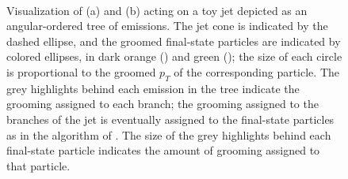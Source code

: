 \begin{figure}[t!]
      \centering
      \centerline{
      ~~~~
      } %
\caption{
    Visualization of (a)  and (b)  acting on a toy jet depicted as an angular-ordered tree of emissions.
    The jet cone is indicated by the dashed ellipse, and the groomed final-state particles are indicated by colored ellipses, in dark orange () and green ();
    the size of each circle is proportional to the groomed \(p_T\) of the corresponding particle.
    The grey highlights behind each emission in the tree indicate the grooming assigned to each branch;
    the grooming assigned to the branches of the jet is eventually assigned to the final-state particles as in the algorithm of .
    The size of the grey highlights behind each final-state particle indicates the amount of grooming assigned to that particle.
}
\label{fig:rsf_tree}
\end{figure}



